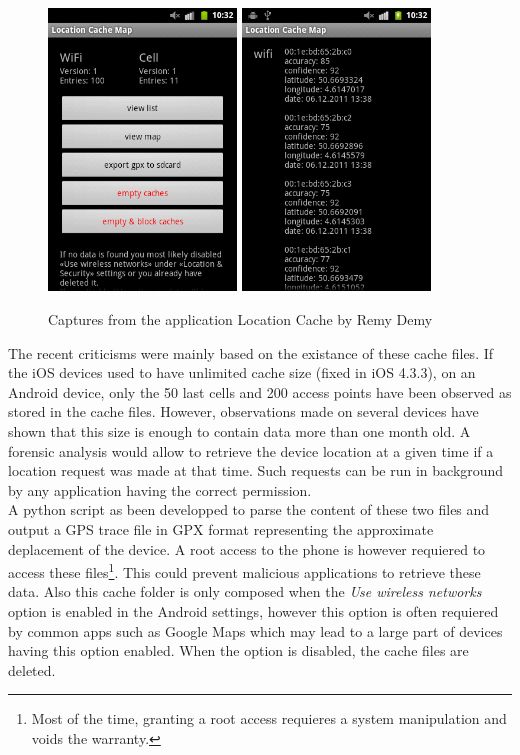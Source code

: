 \begin{figure}[h]
  \centering
  \includegraphics[width=5cm]{images/cache1.png}
  \includegraphics[width=5cm]{images/cache2.png}
  \caption{Captures from the application Location Cache by Remy Demy}
  \label{fig:locmap}
\end{figure}

The recent criticisms were mainly based on the existance of these cache files.
If the iOS devices used to have unlimited cache size (fixed in iOS 4.3.3), on an Android device, only the 50 last cells and 200 access points have been observed as stored in the cache files.
However, observations made on several devices have shown that this size is enough to contain data more than one month old.
A forensic analysis would allow to retrieve the device location at a given time if a location request was made at that time.
Such requests can be run in background by any application having the correct permission.\\

A python script as been developped\cite{soft-locdump} to parse the content of these two files and output a GPS trace file in GPX format representing the approximate deplacement of the device. A root access to the phone is however requiered to access these files\footnote{Most of the time, granting a root access requieres a system manipulation and voids the warranty.}. This could prevent malicious applications to retrieve these data. Also this cache folder is only composed when the \emph{Use wireless networks} option is enabled in the Android settings, however this option is often requiered by common apps such as Google Maps which may lead to a large part of devices having this option enabled. When the option is disabled, the cache files are deleted.\\


